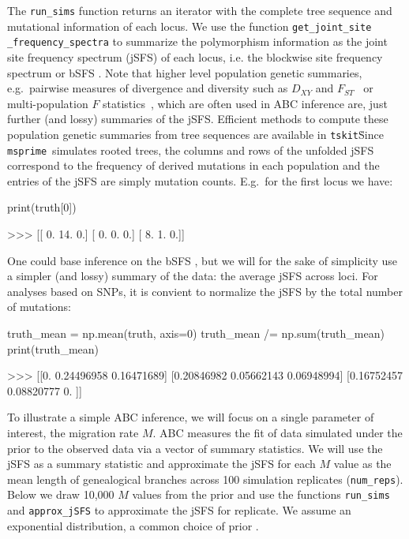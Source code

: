 \documentclass[graybox]{svmult}
\newcommand{\msprime}[0]{\texttt{msprime}}
\newcommand{\tskit}[0]{\texttt{tskit}}
\begin{document}
    The \texttt{run\_sims} function returns an iterator with the complete
tree sequence and mutational information of each locus. We use the
function \texttt{get\_joint\_site} \texttt{\_frequency\_spectra} to summarize the
polymorphism information as the joint site frequency spectrum (jSFS) of
each locus, i.e. the blockwise site frequency spectrum
or bSFS \cite[sensu][]{Lohse2016}.
Note that higher level population genetic summaries, e.g.\ pairwise
measures of divergence and diversity such as \(D_{XY}\) \citep{Nei1972} and
\(F_{ST}\)~\citep{wright1950genetical} or multi-population \(F\)
statistics~\citep{Durand2009,patterson2012ancient}, which are often
used in ABC inference are, just further (and lossy) summaries of the jSFS.
Efficient methods to compute these population genetic summaries from tree sequences
are available in \tskit\.

Since \msprime\ simulates rooted trees, the columns and rows
of the unfolded jSFS correspond to the frequency of derived mutations in
each population and the entries of the jSFS are simply mutation counts.
E.g.\ for the first locus we have:
\begin{pythoncode}
print(truth[0])

>>> [[ 0.  14.  0.]
     [ 0.  0.  0.]
     [ 8.  1.  0.]]
\end{pythoncode}

    One could base inference on the bSFS \citep{Lohse2016, Beeravolu2017, HahnMishr2025}, but we will for the sake of simplicity use a simpler (and lossy)
summary of the data: the average jSFS across loci. For analyses based on
SNPs, it is convient to normalize the jSFS by the total number of
mutations:
\begin{pythoncode}
truth_mean = np.mean(truth, axis=0)
truth_mean /= np.sum(truth_mean)
print(truth_mean)

>>> [[0.         0.24496958 0.16471689]
     [0.20846982 0.05662143 0.06948994]
     [0.16752457 0.08820777 0.        ]]
\end{pythoncode}

    To illustrate a simple ABC inference, we will focus on a single
parameter of interest, the migration rate \(M\).
ABC measures the fit of data simulated under the prior to the observed
data via a vector of summary statistics. We will use the jSFS as a
summary statistic and approximate the jSFS for each \(M\) value as the
mean length of genealogical branches across 100 simulation replicates (\texttt{num\_reps}). Below we
draw 10,000 \(M\) values from the prior and use the functions
\texttt{run\_sims} and \texttt{approx\_jSFS} to approximate the jSFS for
 replicate. We assume an exponential distribution, a common choice of prior \citep{hey2004multilocus}.
\end{document}
